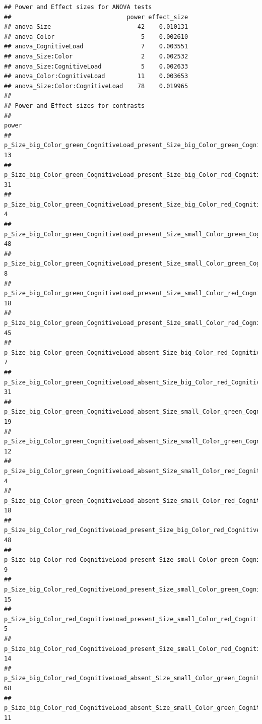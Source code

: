\documentclass[]{book}
\begin{document}
\begin{verbatim}
## Power and Effect sizes for ANOVA tests
##                                power effect_size
## anova_Size                        42    0.010131
## anova_Color                        5    0.002610
## anova_CognitiveLoad                7    0.003551
## anova_Size:Color                   2    0.002532
## anova_Size:CognitiveLoad           5    0.002633
## anova_Color:CognitiveLoad         11    0.003653
## anova_Size:Color:CognitiveLoad    78    0.019965
## 
## Power and Effect sizes for contrasts
##                                                                                            power
## p_Size_big_Color_green_CognitiveLoad_present_Size_big_Color_green_CognitiveLoad_absent        13
## p_Size_big_Color_green_CognitiveLoad_present_Size_big_Color_red_CognitiveLoad_present         31
## p_Size_big_Color_green_CognitiveLoad_present_Size_big_Color_red_CognitiveLoad_absent           4
## p_Size_big_Color_green_CognitiveLoad_present_Size_small_Color_green_CognitiveLoad_present     48
## p_Size_big_Color_green_CognitiveLoad_present_Size_small_Color_green_CognitiveLoad_absent       8
## p_Size_big_Color_green_CognitiveLoad_present_Size_small_Color_red_CognitiveLoad_present       18
## p_Size_big_Color_green_CognitiveLoad_present_Size_small_Color_red_CognitiveLoad_absent        45
## p_Size_big_Color_green_CognitiveLoad_absent_Size_big_Color_red_CognitiveLoad_present           7
## p_Size_big_Color_green_CognitiveLoad_absent_Size_big_Color_red_CognitiveLoad_absent           31
## p_Size_big_Color_green_CognitiveLoad_absent_Size_small_Color_green_CognitiveLoad_present      19
## p_Size_big_Color_green_CognitiveLoad_absent_Size_small_Color_green_CognitiveLoad_absent       12
## p_Size_big_Color_green_CognitiveLoad_absent_Size_small_Color_red_CognitiveLoad_present         4
## p_Size_big_Color_green_CognitiveLoad_absent_Size_small_Color_red_CognitiveLoad_absent         18
## p_Size_big_Color_red_CognitiveLoad_present_Size_big_Color_red_CognitiveLoad_absent            48
## p_Size_big_Color_red_CognitiveLoad_present_Size_small_Color_green_CognitiveLoad_present        9
## p_Size_big_Color_red_CognitiveLoad_present_Size_small_Color_green_CognitiveLoad_absent        15
## p_Size_big_Color_red_CognitiveLoad_present_Size_small_Color_red_CognitiveLoad_present          5
## p_Size_big_Color_red_CognitiveLoad_present_Size_small_Color_red_CognitiveLoad_absent          14
## p_Size_big_Color_red_CognitiveLoad_absent_Size_small_Color_green_CognitiveLoad_present        68
## p_Size_big_Color_red_CognitiveLoad_absent_Size_small_Color_green_CognitiveLoad_absent         11

\end{verbatim}
\end{document}
